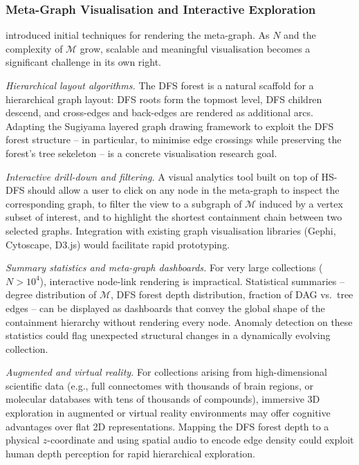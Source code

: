 ﻿\documentclass[12pt,a4paper]{article}
\theoremstyle{plain}
\theoremstyle{definition}
\theoremstyle{remark}
\begin{document}
	\subsubsection*{Meta-Graph Visualisation and Interactive Exploration}

	 introduced initial techniques for rendering the
	meta-graph.  As $N$ and the complexity of $\mathcal{M}$ grow, scalable and
	meaningful visualisation becomes a significant challenge in its own right.

	\emph{Hierarchical layout algorithms.}  The DFS forest is a natural
	scaffold for a hierarchical graph layout: DFS roots form the topmost level,
	DFS children descend, and cross-edges and back-edges are rendered as
	additional arcs.  Adapting the Sugiyama layered graph drawing framework
	to exploit the DFS forest structure -- in particular, to minimise
	edge crossings while preserving the forest's tree sekeleton -- is a
	concrete visualisation research goal.

	\emph{Interactive drill-down and filtering.}  A visual analytics tool
	built on top of HS-DFS should allow a user to click on any node in the
	meta-graph to inspect the corresponding graph, to filter the view to
	a subgraph of $\mathcal{M}$ induced by a vertex subset of interest, and
	to highlight the shortest containment chain between two selected graphs.
	Integration with existing graph visualisation libraries (Gephi, Cytoscape,
	D3.js) would facilitate rapid prototyping.

	\emph{Summary statistics and meta-graph dashboards.}  For very large
	collections ($N > 10^4$), interactive node-link rendering is impractical.
	Statistical summaries -- degree distribution of $\mathcal{M}$, DFS forest
	depth distribution, fraction of DAG vs.\ tree edges -- can be displayed
	as dashboards that convey the global shape of the containment hierarchy
	without rendering every node.  Anomaly detection on these statistics
	could flag unexpected structural changes in a dynamically evolving
	collection.

	\emph{Augmented and virtual reality.}  For collections arising from
	high-dimensional scientific data (e.g., full connectomes with thousands
	of brain regions, or molecular databases with tens of thousands of
	compounds), immersive 3D exploration in augmented or virtual reality
	environments may offer cognitive advantages over flat 2D representations.
	Mapping the DFS forest depth to a physical $z$-coordinate and using
	spatial audio to encode edge density could exploit human depth perception
	for rapid hierarchical exploration.
\end{document}
